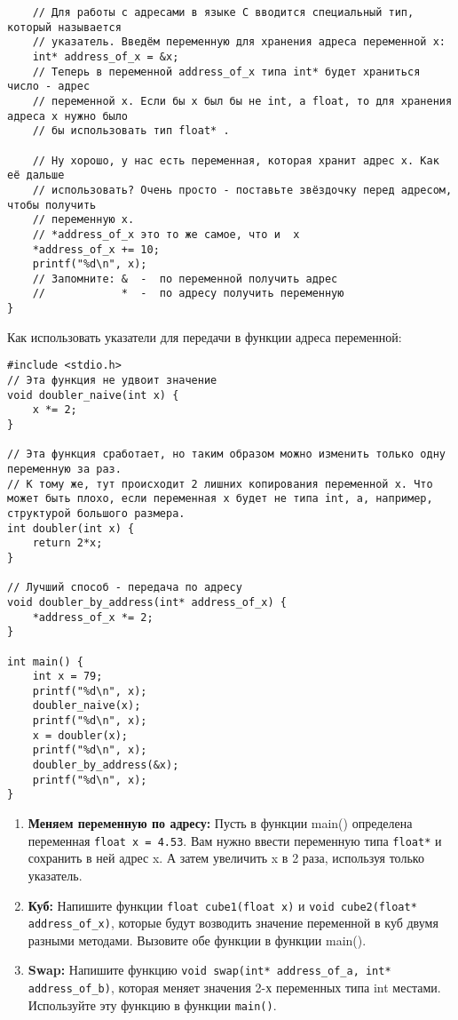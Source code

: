 \documentclass{article}
\begin{document}
\begin{enumerate}
\begin{lstlisting}
    // Для работы с адресами в языке C вводится специальный тип, который называется 
    // указатель. Введём переменную для хранения адреса переменной x:
    int* address_of_x = &x;
    // Теперь в переменной address_of_x типа int* будет храниться число - адрес 
    // переменной x. Если бы x был бы не int, а float, то для хранения адреса x нужно было 
    // бы использовать тип float* .
    
    // Ну хорошо, у нас есть переменная, которая хранит адрес x. Как её дальше 
    // использовать? Очень просто - поставьте звёздочку перед адресом, чтобы получить 
    // переменную x.
    // *address_of_x это то же самое, что и  x
    *address_of_x += 10;
    printf("%d\n", x);
    // Запомните: &  -  по переменной получить адрес
    //            *  -  по адресу получить переменную
} 
\end{lstlisting}

Как использовать указатели для передачи в функции адреса переменной: 
\begin{lstlisting}
#include <stdio.h>
// Эта функция не удвоит значение
void doubler_naive(int x) {
	x *= 2;
}

// Эта функция сработает, но таким образом можно изменить только одну переменную за раз.
// К тому же, тут происходит 2 лишних копирования переменной x. Что может быть плохо, если переменная x будет не типа int, а, например, структурой большого размера.
int doubler(int x) {
	return 2*x;
}

// Лучший способ - передача по адресу
void doubler_by_address(int* address_of_x) {
	*address_of_x *= 2;
}

int main() {
	int x = 79;
	printf("%d\n", x);
	doubler_naive(x);
	printf("%d\n", x);
	x = doubler(x);
	printf("%d\n", x);
	doubler_by_address(&x);
	printf("%d\n", x);
}
\end{lstlisting}

\begin{enumerate}
\item \textbf{Меняем переменную по адресу:} Пусть в функции main() определена переменная \texttt{float\ x = 4.53}. Вам нужно ввести переменную типа \texttt{float*} и сохранить в ней адрес x. А затем увеличить x в 2 раза, используя только указатель.
\item \textbf{Куб:} Напишите функции \texttt{float cube1(float x)} и \texttt{void cube2(float* address\_of\_x)}, которые будут возводить значение переменной в куб двумя разными методами. Вызовите обе функции в функции main(). 
\item \textbf{Swap:} Напишите функцию \texttt{void swap(int* address\_of\_a, int* address\_of\_b)}, которая меняет значения 2-х переменных типа int местами. Используйте эту функцию в функции \texttt{main()}. 


\end{enumerate}
\end{enumerate}
\end{document}

